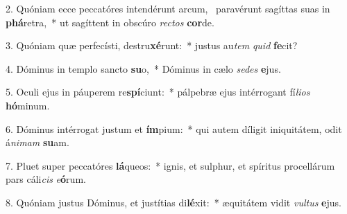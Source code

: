 2. Quóniam ecce peccatóres intendérunt arcum, \dag\  paravérunt sagíttas suas in \textbf{phá}retra,~*  ut sagíttent in obscúro \textit{rec}\textit{tos} \textbf{cor}de.\

3. Quóniam quæ perfecísti, destru\textbf{xé}runt:~*  justus au\textit{tem} \textit{quid} \textbf{fe}cit?\

4. Dóminus in templo sancto \textbf{su}o,~*  Dóminus in cælo \textit{se}\textit{des} \textbf{e}jus.\

5. Oculi ejus in páuperem re\textbf{spí}ciunt:~*  pálpebræ ejus intérrogant fí\textit{li}\textit{os} \textbf{hó}minum.\

6. Dóminus intérrogat justum et \textbf{ím}pium:~*  qui autem díligit iniquitátem, odit á\textit{ni}\textit{mam} \textbf{su}am.\

7. Pluet super peccatóres \textbf{lá}queos:~*  ignis, et sulphur, et spíritus procellárum pars cáli\textit{cis} \textit{e}\textbf{ó}rum.\

8. Quóniam justus Dóminus, et justítias di\textbf{lé}xit:~*  æquitátem vidit \textit{vul}\textit{tus} \textbf{e}jus.\

